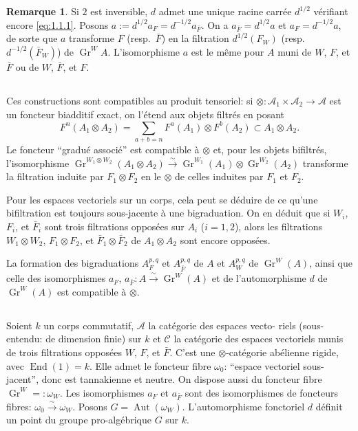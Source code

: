 \documentclass[12pt,a4paper]{article}
\theoremstyle{plain}
\theoremstyle{definition}
\newtheorem{remarque}[lemme]{Remarque}
\DeclareMathOperator{\Gr}{Gr}
\DeclareMathOperator{\Aut}{Aut}
\DeclareMathOperator{\End}{End}
\newcommand{\A}{\mathcal{A}}
\begin{document}
\begin{remarque}\label{rem:1.3}
Si $2$ est inversible, $d$ admet une unique racine carr\'{e}e $d^{1/2}$
v\'{e}rifiant encore \eqref{eq:1.1.1}. Posons $a := d^{1/2} a_F = d^{-1/2} a_{\bar{F}}$. On a $a_{\bar{F}} = d^{1/2} a$
et $a_F = d^{-1/2} a$, de sorte que $a$ transforme $F$ (resp.~$\bar{F}$) en la filtration
$d^{1/2}(F_W)$ (resp.~$d^{-1/2}(\bar{F}_W)$) de $\Gr^W\!A$. L'isomorphisme $a$ est le m\^{e}me
pour $A$ muni de $W$, $F$, et $\bar{F}$ ou de $W$, $\bar{F}$, et $F$.
\end{remarque}

\subsection{}

Ces constructions sont compatibles au produit tensoriel: si $\otimes :
\A_1 \times \A_2 \to \A$ est un foncteur biadditif exact, on l'\'{e}tend aux objets filtr\'{e}s
en posant
\begin{equation*}
F^n(A_1 \otimes A_2) = \sum_{a+b=n} F^a(A_1) \otimes F^b(A_2) \subset A_1 \otimes A_2.
\end{equation*}
Le foncteur ``gradu\'{e} associ\'{e}'' est compatible \`{a} $\otimes$ et, pour les objets bifiltr\'{e}s,
l'isomorphisme $\Gr^{W_1 \otimes W_2}(A_1 \otimes A_2) \xrightarrow{\sim} \Gr^{W_1}(A_1) \otimes \Gr^{W_2}(A_2)$ transforme la
filtration induite par $F_1 \otimes F_2$ en le $\otimes$ de celles induites par $F_1$ et $F_2$.

Pour les espaces vectoriels sur un corps, cela peut se d\'{e}duire de ce qu'une
bifiltration est toujours sous-jacente \`{a} une bigraduation. On en d\'{e}duit que si
$W_i$, $F_i$, et $\bar{F}_i$ sont trois filtrations oppos\'{e}es sur $A_i$ ($i=1,2$), alors
les filtrations $W_1 \otimes W_2$, $F_1 \otimes F_2$, et $\bar{F}_1 \otimes \bar{F}_2$ de $A_1 \otimes A_2$ sont encore oppos\'{e}es.

La formation des bigraduations $A_F^{p,q}$ et $A_{\bar{F}}^{p,q}$ de $A$ et $A_{W}^{p,q}$ de $\Gr^W\!(A)$, ainsi
que celle des isomorphismes $a_F$, $a_{\bar{F}} : A \xrightarrow{\sim} \Gr^W\!(A)$ et de l'automorphisme
$d$ de $\Gr^W\!(A)$ est compatible \`{a} $\otimes$.

\subsection{}

Soient $k$ un corps commutatif, $\A$ la cat\'{e}gorie des espaces vecto-
riels (sous-entendu: de dimension finie) sur $k$ et $\mathscr{C}$ la cat\'{e}gorie des espaces
vectoriels munis de trois filtrations oppos\'{e}es $W$, $F$, et $\bar{F}$. C'est une $\otimes$-cat\'{e}gorie ab\'{e}lienne rigide, avec $\End(1) = k$. Elle admet le foncteur fibre
$\omega_0$: ``espace vectoriel sous-jacent'', donc est tannakienne et neutre. On dispose aussi du foncteur fibre $\Gr^W =: \omega_W$. Les isomorphismes $a_F$ et $a_{\bar{F}}$ sont
des isomorphismes de foncteurs fibres: $\omega_0 \xrightarrow{\sim} \omega_W$. Posons $G = \Aut(\omega_W)$.
L'automorphisme fonctoriel $d$ d\'{e}finit un point du groupe pro-alg\'{e}brique $G$
sur $k$.
\end{document}
